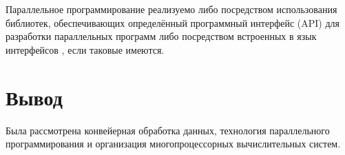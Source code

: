Параллельное программирование реализуемо либо посредством использования библиотек, обеспечивающих определённый программный интерфейс ({\ttfamily API}) для разработки параллельных программ \cite{lib:cxxthread} либо посредством встроенных в язык интерфейсов \cite{concurrencygo}, если таковые имеются.


\section*{Вывод}
Была рассмотрена конвейерная обработка данных, технология параллельного программирования и организация многопроцессорных вычислительных систем.
